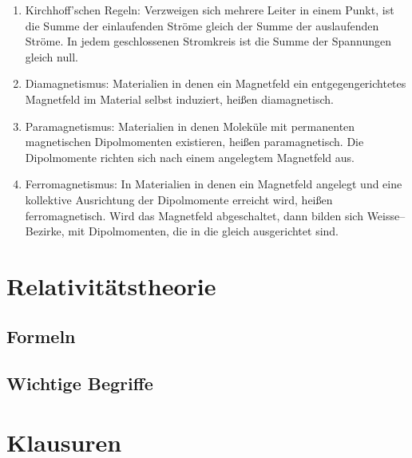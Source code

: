 \documentclass[a4paper,12pt]{article}
\numberwithin{equation}{section}
\begin{document}
\begin{enumerate}[label=$\circ$]
        \item Kirchhoff'schen Regeln: Verzweigen sich mehrere Leiter in einem Punkt, ist die Summe der einlaufenden Ströme gleich der Summe der auslaufenden Ströme. In jedem geschlossenen Stromkreis ist die Summe der Spannungen gleich null.
        \item Diamagnetismus: Materialien in denen ein Magnetfeld ein entgegengerichtetes Magnetfeld im Material selbst induziert, heißen diamagnetisch.
        \item Paramagnetismus: Materialien in denen Moleküle mit permanenten magnetischen Dipolmomenten existieren, heißen paramagnetisch. Die Dipolmomente richten sich nach einem angelegtem Magnetfeld aus.
        \item Ferromagnetismus: In Materialien in denen ein Magnetfeld angelegt und eine kollektive Ausrichtung der Dipolmomente erreicht wird, heißen ferromagnetisch. Wird das Magnetfeld abgeschaltet, dann bilden sich Weisse--Bezirke, mit Dipolmomenten, die in die gleich ausgerichtet sind.
\end{enumerate}



\newpage


\section{Relativitätstheorie}


\subsection{Formeln}


\newpage


\subsection{Wichtige Begriffe}



\newpage


\newpage
\section{Klausuren}
\end{document}
